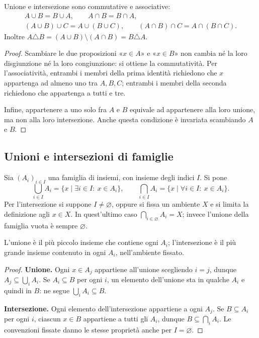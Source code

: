 \begin{proposizione}
Unione e intersezione sono commutative e associative:
\[
\begin{gathered}
A\cup B=B\cup A,\qquad A\cap B=B\cap A,\\
(A\cup B)\cup C=A\cup(B\cup C),\qquad
(A\cap B)\cap C=A\cap(B\cap C).
\end{gathered}
\]
Inoltre $A\triangle B=(A\cup B)\setminus(A\cap B)=B\triangle A$.
\end{proposizione}
\begin{proof}
Scambiare le due proposizioni «$x\in A$» e «$x\in B$» non cambia né la loro disgiunzione né la loro congiunzione: si ottiene la commutatività. Per l'associatività, entrambi i membri della prima identità richiedono che $x$ appartenga ad almeno uno tra $A,B,C$; entrambi i membri della seconda richiedono che appartenga a tutti e tre.

Infine, appartenere a uno solo fra $A$ e $B$ equivale ad appartenere alla loro unione, ma non alla loro intersezione. Anche questa condizione è invariata scambiando $A$ e $B$.
\end{proof}

\subsection{Unioni e intersezioni di famiglie}
\begin{definizione}
Sia $(A_i)_{i\in I}$ una famiglia di insiemi, con insieme degli indici $I$. Si pone
\[
\bigcup_{i\in I}A_i=\{x\mid \exists i\in I:\ x\in A_i\},\qquad
\bigcap_{i\in I}A_i=\{x\mid \forall i\in I:\ x\in A_i\}.
\]
Per l'intersezione si suppone $I\ne\varnothing$, oppure si fissa un ambiente $X$ e si limita la definizione agli $x\in X$. In quest'ultimo caso $\bigcap_{i\in\varnothing}A_i=X$; invece l'unione della famiglia vuota è sempre $\varnothing$.
\end{definizione}

\begin{proposizione}
L'unione è il più piccolo insieme che contiene ogni $A_i$; l'intersezione è il più grande insieme contenuto in ogni $A_i$, nell'ambiente fissato.
\end{proposizione}
\begin{proof}
\textbf{Unione.} Ogni $x\in A_j$ appartiene all'unione scegliendo $i=j$, dunque $A_j\subseteq\bigcup_i A_i$. Se $A_i\subseteq B$ per ogni $i$, un elemento dell'unione sta in qualche $A_i$ e quindi in $B$: ne segue $\bigcup_i A_i\subseteq B$.

\textbf{Intersezione.} Ogni elemento dell'intersezione appartiene a ogni $A_j$. Se $B\subseteq A_i$ per ogni $i$, ciascun $x\in B$ appartiene a tutti gli $A_i$, dunque $B\subseteq\bigcap_i A_i$. Le convenzioni fissate danno le stesse proprietà anche per $I=\varnothing$.
\end{proof}

